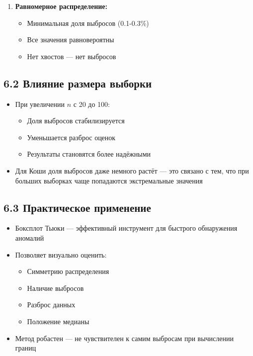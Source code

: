 \documentclass[a4paper,14pt]{extarticle}
\begin{document}
\begin{enumerate}
    \item \textbf{Равномерное распределение:}
    \begin{itemize}
        \item Минимальная доля выбросов (0.1-0.3\%)
        \item Все значения равновероятны
        \item Нет хвостов — нет выбросов
    \end{itemize}
\end{enumerate}

\subsection*{6.2 Влияние размера выборки}

\begin{itemize}
    \item При увеличении $n$ с 20 до 100:
    \begin{itemize}
        \item Доля выбросов стабилизируется
        \item Уменьшается разброс оценок
        \item Результаты становятся более надёжными
    \end{itemize}
    \item Для Коши доля выбросов даже немного растёт — это связано с тем, что при больших выборках чаще попадаются экстремальные значения
\end{itemize}

\subsection*{6.3 Практическое применение}

\begin{itemize}
    \item Боксплот Тьюки — эффективный инструмент для быстрого обнаружения аномалий
    \item Позволяет визуально оценить:
    \begin{itemize}
        \item Симметрию распределения
        \item Наличие выбросов
        \item Разброс данных
        \item Положение медианы
    \end{itemize}
    \item Метод робастен — не чувствителен к самим выбросам при вычислении границ
\end{itemize}
\end{document}
